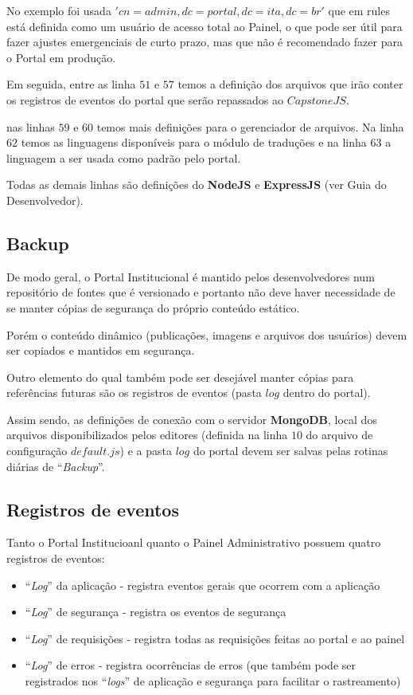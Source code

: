 \begin{displayquote}
    No exemplo foi usada $'cn=admin,dc=portal,dc=ita,dc=br'$ que em rules está definida como um usuário de acesso total ao Painel, o que pode ser útil para fazer ajustes emergenciais de curto prazo, mas que não é recomendado fazer para o Portal em produção.
\end{displayquote}

Em seguida, entre as linha $51$ e $57$ temos a definição dos arquivos que irão conter os registros de eventos do portal que serão repassados ao $CapstoneJS$.

nas linhas $59$ e $60$ temos mais definições para o gerenciador de arquivos. Na linha $62$ temos as linguagens disponíveis para o módulo de traduções e na linha $63$ a linguagem a ser usada como padrão pelo portal.

Todas as demais linhas são definições do \textbf{NodeJS} e \textbf{ExpressJS} (ver Guia do Desenvolvedor).

\subsection{Backup}

De modo geral, o Portal Institucional é mantido pelos desenvolvedores num repositório de fontes que é versionado e portanto não deve haver necessidade de se manter cópias de segurança do próprio conteúdo estático.

Porém o conteúdo dinâmico (publicações, imagens e arquivos dos usuários) devem ser copiados e mantidos em segurança.

Outro elemento do qual também pode ser desejável manter cópias para referências futuras são os registros de eventos (pasta $log$ dentro do portal).

Assim sendo, as definições de conexão com o servidor \textbf{MongoDB}, local dos arquivos disponibilizados pelos editores (definida na linha $10$ do arquivo de configuração $default.js$) e a pasta $log$ do portal devem ser salvas pelas rotinas diárias de ``\textit{Backup}''.

\subsection{Registros de eventos}

Tanto o Portal Institucioanl quanto o Painel Administrativo possuem quatro registros de eventos:

\begin{itemize}
    \item ``\textit{Log}'' da aplicação - registra eventos gerais que ocorrem com a aplicação
    \item ``\textit{Log}'' de segurança - registra os eventos de segurança
    \item ``\textit{Log}'' de requisições - registra todas as requisições feitas ao portal e ao painel
    \item ``\textit{Log}'' de erros - registra ocorrências de erros (que também pode ser registrados nos ``\textit{logs}'' de aplicação e segurança para facilitar o rastreamento)
\end{itemize}

